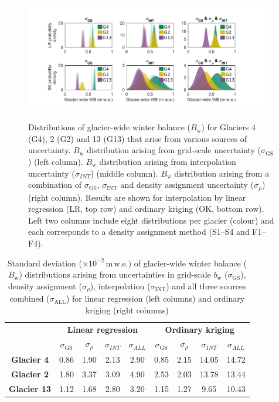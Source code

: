 \documentclass[twocolumn, letterpaper]{igs}
\begin{document}
\begin{figure}
	\centering
	\includegraphics[width =0.95\textwidth]{WSMBDist.pdf}\\
	\caption{Distributions of glacier-wide winter balance ($B_\mathrm{w}$) for Glaciers 4 (G4), 2 (G2) and 13 (G13) that arise from various sources of uncertainty. $B_\mathrm{w}$ distribution arising from grid-scale uncertainty ($\sigma_{\mathrm{GS}}$) (left column). $B_\mathrm{w}$ distribution arising from interpolation uncertainty ($\sigma_{INT}$) (middle column). $B_\mathrm{w}$ distribution arising from a combination of $\sigma_{\mathrm{GS}}$, $\sigma_{\mathrm{INT}}$ and density assignment uncertainty ($\sigma_{\rho}$) (right column). Results are shown for interpolation by linear regression (LR, top row) and ordinary kriging (OK, bottom row). Left two columns include eight distributions per glacier (colour) and each corresponds to a density assignment method (S1--S4 and F1--F4).}
	\label{fig:WSMBDist_LR}
\end{figure}

\begin{table}[]
\centering
\caption{Standard deviation ($\times10^{-2}$\,m\,w.e.) of glacier-wide winter balance ($B_\mathrm{w}$) distributions arising from uncertainties in grid-scale $b_\mathrm{w}$ ($\sigma_{\mathrm{GS}}$), density assignment ($\sigma_{\rho}$), interpolation ($\sigma_{\mathrm{INT}}$) and all three sources combined ($\sigma_{\mathrm{ALL}}$) for linear regression (left columns) and ordinary kriging (right columns)}
\label{tab:WSMBdistribution_sigma}
\begin{tabular}{c|cccc|cccc}
 & \multicolumn{4}{c|}{\textbf{Linear regression}} & \multicolumn{4}{c}{\textbf{Ordinary kriging}} \\
\textbf{} & $\sigma_{\mathrm{GS}}$ & $\sigma_{\rho}$ & $\sigma_{INT}$ & $\sigma_{ALL}$ & $\sigma_{\mathrm{GS}}$ & $\sigma_{\rho}$ & $\sigma_{INT}$ & $\sigma_{ALL}$ \\ \hline
\textbf{Glacier 4} & 0.86 & 1.90 & 2.13 & 2.90 & 0.85 & 2.15 & 14.05 & 14.72 \\
\textbf{Glacier 2} & 1.80 & 3.37 & 3.09 & 4.90 & 2.53 & 2.03 & 13.78 & 13.44 \\
\textbf{Glacier 13} & 1.12 & 1.68 & 2.80 & 3.20 & 1.15 & 1.27 & 9.65 & 10.43
\end{tabular}
\end{table}
\end{document}
